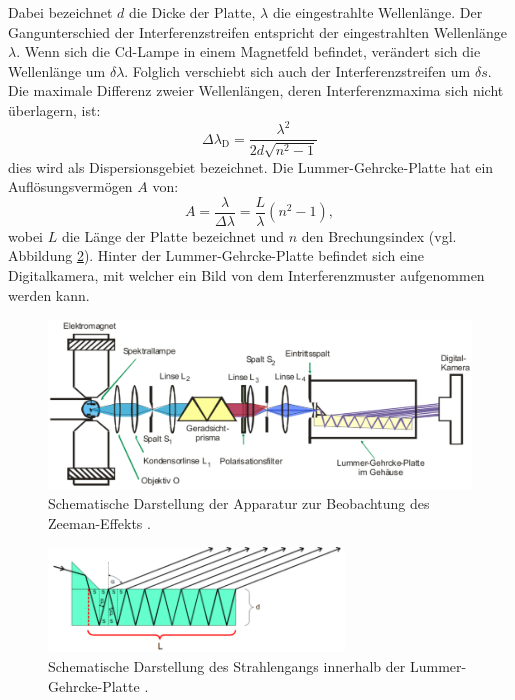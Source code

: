 Dabei bezeichnet $d$ die Dicke der Platte, $\lambda$ die eingestrahlte Wellenlänge.
Der Gangunterschied der Interferenzstreifen entspricht der eingestrahlten Wellenlänge
$\lambda$. Wenn sich die Cd-Lampe in einem Magnetfeld befindet, verändert sich die
Wellenlänge um $\delta\lambda$. Folglich verschiebt sich auch der Interferenzstreifen
um $\delta s$. Die maximale Differenz zweier Wellenlängen, deren Interferenzmaxima
sich nicht überlagern, ist:
\begin{equation}
  \label{eq:lambda_D}
  \Delta \lambda_\text{D} = \frac{\lambda^2}{2d\sqrt{n^2-1}}
\end{equation}
dies wird als Dispersionsgebiet bezeichnet. Die Lummer-Gehrcke-Platte hat ein
Auflösungsvermögen $A$ von:
\begin{equation}
  \label{eq:Aufloesung}
  A = \frac{\lambda}{\Delta \lambda} = \frac{L}{\lambda}\left(n^2-1\right),
\end{equation}
wobei $L$ die Länge der Platte bezeichnet und $n$ den Brechungsindex
(vgl. Abbildung \ref{fig:lummer}). Hinter der Lummer-Gehrcke-Platte befindet sich eine
Digitalkamera, mit welcher ein Bild von dem Interferenzmuster aufgenommen werden kann.

\begin{figure}
  \centering
  \includegraphics[width=\textwidth]{SchematischApparatur.png}
  \caption{Schematische Darstellung der Apparatur zur Beobachtung des Zeeman-Effekts \cite{sample}.}
  \label{fig:apparatur}
\end{figure}

\begin{figure}
  \centering
  \includegraphics[width=0.7\textwidth]{Lummer.png}
  \caption{Schematische Darstellung des Strahlengangs innerhalb der Lummer-Gehrcke-Platte \cite{sample}.}
  \label{fig:lummer}
\end{figure}




